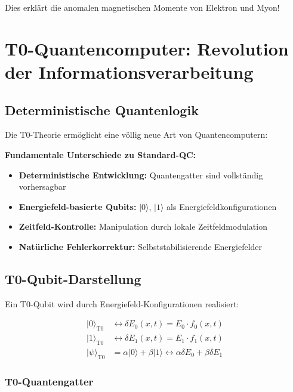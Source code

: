 \documentclass[12pt,a4paper]{article}
\newcommand{\deltaE}{\delta E}
\begin{document}
	Dies erklärt die anomalen magnetischen Momente von Elektron und Myon!
	
	\section{T0-Quantencomputer: Revolution der Informationsverarbeitung}
	
	\subsection{Deterministische Quantenlogik}
	
	Die T0-Theorie ermöglicht eine völlig neue Art von Quantencomputern:
	
	\begin{tcolorbox}[colback=yellow!5!white,colframe=yellow!75!black,title=T0-Quantencomputer-Prinzipien]
		\textbf{Fundamentale Unterschiede zu Standard-QC:}
		\begin{itemize}
			\item \textbf{Deterministische Entwicklung:} Quantengatter sind vollständig vorhersagbar
			\item \textbf{Energiefeld-basierte Qubits:} $|0\rangle$, $|1\rangle$ als Energiefeldkonfigurationen
			\item \textbf{Zeitfeld-Kontrolle:} Manipulation durch lokale Zeitfeldmodulation
			\item \textbf{Natürliche Fehlerkorrektur:} Selbststabilisierende Energiefelder
		\end{itemize}
	\end{tcolorbox}
	
	\subsection{T0-Qubit-Darstellung}
	
	Ein T0-Qubit wird durch Energiefeld-Konfigurationen realisiert:
	
	\begin{align}
		|0\rangle_{\text{T0}} &\leftrightarrow \deltaE_0(x,t) = E_0 \cdot f_0(x,t) \\
		|1\rangle_{\text{T0}} &\leftrightarrow \deltaE_1(x,t) = E_1 \cdot f_1(x,t) \\
		|\psi\rangle_{\text{T0}} &= \alpha|0\rangle + \beta|1\rangle \leftrightarrow \alpha\deltaE_0 + \beta\deltaE_1
	\end{align}
	
	\subsubsection{T0-Quantengatter}
	
\end{document}
